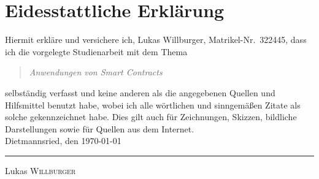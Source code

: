 \chapter{Eidesstattliche Erklärung}
Hiermit erkläre und versichere ich, Lukas Willburger, Matrikel-Nr.\ 322445, dass ich die vorgelegte Studienarbeit mit dem Thema
\begin{quote}
\centering \textit{Anwendungen von Smart Contracts}
\end{quote}
selbständig verfasst und keine anderen als die angegebenen Quellen und Hilfsmittel benutzt habe, wobei ich alle wörtlichen und sinngemäßen Zitate als solche gekennzeichnet habe.  Dies gilt auch für Zeichnungen, Skizzen, bildliche Darstellungen sowie für Quellen aus dem Internet.
\\[6ex]

Dietmannsried, den \today \\


\rule[-0.2cm]{5cm}{0.5pt}

Lukas \textsc{Willburger} 

